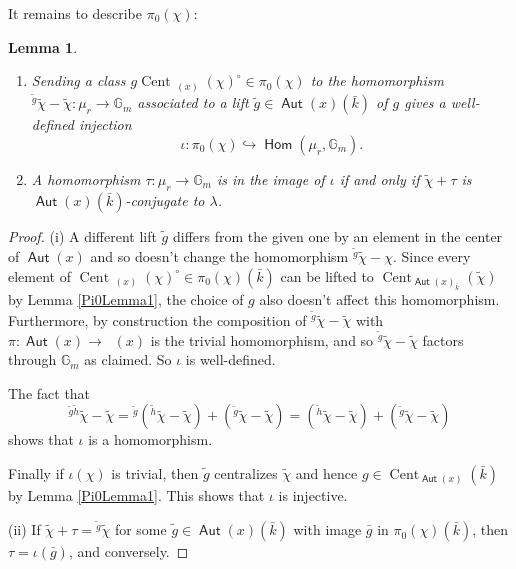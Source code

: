\documentclass{article}
\DeclareMathOperator{\Hom}{\mathsf{Hom}}
\DeclareMathOperator{\Aut}{\mathsf{Aut}}
\DeclareMathOperator{\uAut}{\underline{\mathsf{Aut}}}
\newcommand{\BG}{{\mathbb{G}}}
\DeclareMathOperator{\Cent}{Cent}
\let\into\hookrightarrow
\theoremstyle{definition}
\theoremstyle{plain}
\newtheorem{lemma}[definition]{Lemma}
\begin{document}
     It remains to describe $\pi_0(\chi)$:

    \begin{lemma} \label{Pi0ChiDesc}
        \begin{enumerate}
            \item Sending a class $g \Cent_{\uAut(x)}(\chi)^\circ \in \pi_0(\chi)$ to the homomorphism ${}^{\tilde{g}}{\tilde\chi} - \tilde\chi \colon \mu_r \to \BG_m$ associated to a lift $\tilde g \in \Aut(x)(\bar k)$ of $g$ gives a well-defined injection
            \begin{equation*}
                \iota\colon \pi_0(\chi) \into \Hom(\mu_r, \BG_m).
            \end{equation*}
            \item A homomorphism $\tau\colon \mu_r \to \BG_m$ is in the image of $\iota$ if and only if $\tilde\chi+\tau$ is $\Aut(x)(\bar k)$-conjugate to $\lambda$.
                 
        \end{enumerate}
    \end{lemma}
\begin{proof}
    (i) A different lift $\tilde g$ differs from the given one by an element in the center of $\Aut(x)$ and so doesn't change the homomorphism ${}^{\tilde g} \tilde \chi - \chi$. Since every element of $\Cent_{\uAut(x)}(\chi)^\circ \in \pi_0(\chi)(\bar k)$ can be lifted to $\Cent_{\Aut(x)_{\bar k}}(\tilde \chi)$ by Lemma \ref{Pi0Lemma1}, the choice of $g$ also doesn't affect this homomorphism. Furthermore, by construction the composition of ${}^{\tilde g}\tilde\chi-\tilde\chi$ with $\pi\colon \Aut(x) \to \uAut(x)$ is the trivial homomorphism, and so ${}^{\tilde g}\tilde\chi-\tilde\chi$ factors through $\BG_m$ as claimed. So $\iota$ is well-defined.

    The fact that
    \begin{equation*}
        {}^{\tilde g \tilde h}\tilde\chi - \tilde \chi={}^{\tilde g}({}^{\tilde h}\tilde\chi - \tilde\chi) + ({}^{\tilde g}\tilde\chi - \tilde \chi)=({}^{\tilde h}\tilde\chi - \tilde\chi) + ({}^{\tilde g}\tilde\chi - \tilde \chi)
    \end{equation*}
    shows that $\iota$ is a homomorphism.

    Finally if $\iota(\chi)$ is trivial, then $\tilde g$ centralizes $\tilde\chi$ and hence $g \in \Cent_{\Aut(x)}(\bar k)$ by Lemma \ref{Pi0Lemma1}. This shows that $\iota$ is injective.

    (ii) If $\tilde\chi+\tau={}^{\tilde g}\tilde\chi$ for some $\tilde g \in \Aut(x)(\bar k)$ with image $\bar g$ in $\pi_0(\chi)(\bar k)$, then $\tau=\iota(\bar g)$, and conversely.

\end{proof}
\end{document}

